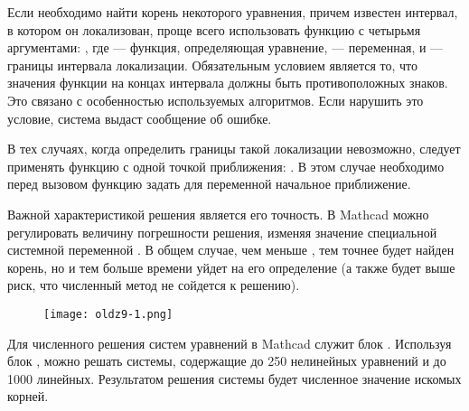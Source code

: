 Если необходимо найти корень некоторого уравнения, причем известен интервал, в котором он локализован, проще всего использовать функцию с четырьмя аргументами: , где  --- функция, определяющая уравнение,  --- переменная,  и  --- границы интервала локализации. Обязательным условием является то, что значения функции на концах интервала должны быть противоположных знаков. Это связано с особенностью используемых  алгоритмов. Если нарушить это условие, система выдаст сообщение об ошибке.


В тех случаях, когда определить границы такой локализации невозможно, следует применять функцию  с одной точкой приближения: . В этом случае необходимо перед вызовом функцию  задать для переменной  начальное приближение.

Важной характеристикой решения является его точность. В Mathcad можно регулировать величину погрешности решения, изменяя значение специальной системной переменной . В общем случае, чем меньше , тем точнее будет найден корень, но и тем больше времени уйдет на его определение (а также будет выше риск, что численный метод не сойдется к решению).

\begin{figure}[h]
	\begin{center}
		\texttt{[image: oldz9-1.png]}
	\end{center}
\end{figure}

Для численного решения систем уравнений в Mathcad служит блок . Используя блок , можно решать системы, содержащие до 250 нелинейных уравнений и до 1000 линейных. Результатом решения системы будет численное значение искомых корней.


